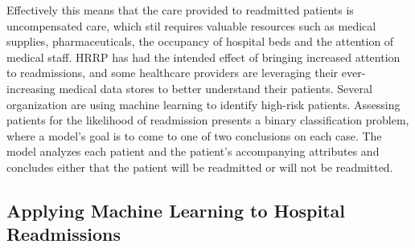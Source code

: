 \documentclass[sigconf]{acmart}
\begin{document}
Effectively this means that the care provided to readmitted patients is uncompensated care, which stil requires valuable resources such as medical supplies, pharmaceuticals, the occupancy of hospital beds and the attention of medical staff. HRRP has had the intended effect of bringing increased attention to readmissions, and some healthcare providers are leveraging their ever-increasing medical data stores to better understand their patients. Several organization are using machine learning to identify high-risk patients. Assessing patients for the likelihood of readmission presents a binary classification problem, where a model's goal is to come to one of two conclusions on each case. The model analyzes each patient and the patient's accompanying attributes and concludes either that the patient will be readmitted or will not be readmitted.

\subsection{Applying Machine Learning to Hospital Readmissions}
\end{document}
